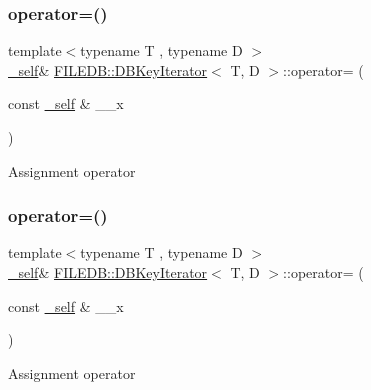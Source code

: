 \subsubsection{\texorpdfstring{operator=()}{operator=()}\hspace{0.1cm}{\footnotesize\ttfamily [1/3]}}
{\footnotesize\ttfamily template$<$typename T , typename D $>$ \\
\mbox{\hyperlink{classFILEDB_1_1DBKeyIterator_aaf7773c7a848ec6e04bc738dd794ace1}{\+\_\+self}}\& \mbox{\hyperlink{classFILEDB_1_1DBKeyIterator}{F\+I\+L\+E\+D\+B\+::\+D\+B\+Key\+Iterator}}$<$ T, D $>$\+::operator= (\begin{DoxyParamCaption}\item[{const \mbox{\hyperlink{classFILEDB_1_1DBKeyIterator_aaf7773c7a848ec6e04bc738dd794ace1}{\+\_\+self}} \&}]{\+\_\+\+\_\+x }\end{DoxyParamCaption})\hspace{0.3cm}{\ttfamily [inline]}}

Assignment operator \mbox{\label{classFILEDB_1_1DBKeyIterator_adfa49c128d637dae0263553529126575}} 
\subsubsection{\texorpdfstring{operator=()}{operator=()}\hspace{0.1cm}{\footnotesize\ttfamily [2/3]}}
{\footnotesize\ttfamily template$<$typename T , typename D $>$ \\
\mbox{\hyperlink{classFILEDB_1_1DBKeyIterator_aaf7773c7a848ec6e04bc738dd794ace1}{\+\_\+self}}\& \mbox{\hyperlink{classFILEDB_1_1DBKeyIterator}{F\+I\+L\+E\+D\+B\+::\+D\+B\+Key\+Iterator}}$<$ T, D $>$\+::operator= (\begin{DoxyParamCaption}\item[{const \mbox{\hyperlink{classFILEDB_1_1DBKeyIterator_aaf7773c7a848ec6e04bc738dd794ace1}{\+\_\+self}} \&}]{\+\_\+\+\_\+x }\end{DoxyParamCaption})\hspace{0.3cm}{\ttfamily [inline]}}

Assignment operator \mbox{\label{classFILEDB_1_1DBKeyIterator_adfa49c128d637dae0263553529126575}} 
